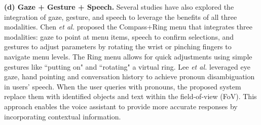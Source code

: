 \documentclass[review]{fcs}
\newcommand{\revise}[2]{\textcolor[rgb]{0,0,0}{#2}}
\begin{document}
\textbf{(d) Gaze + Gesture + Speech.} Several studies have also explored the integration of gaze, gesture, and speech to leverage the benefits of all three modalities.
\revise{Chen \textit{et al.} proposed the Compass+Ring menu that integrates three modalities: gaze is used to point at menu items, speech to confirm selections (avoiding the Midas Touch problem), and gestures to adjust parameters by rotating the wrist or pinching fingers to navigate menu levels. The Ring menu allows for quick adjustments using simple gestures like ``putting on" and ``rotating" a virtual ring \cite{DBLP:conf/ismar/ChenGFCL23}. Lee \textit{et al.} leveraged eye gaze, hand pointing and conversation history to achieve pronoun disambiguation in users' speech. When the user queries using pronouns, the proposed system identifies objects and text within the field-of-view (FoV) to replace the pronouns. This approach enables the voice assistant to provide more accurate responses by incorporating contextual information \cite{DBLP:conf/chi/0005WBCRF24}.}{Chen \textit{et al.} \cite{DBLP:conf/ismar/ChenGFCL23} proposed the Compass+Ring menu that integrates three modalities: gaze to point at menu items, speech to confirm selections, and gestures to adjust parameters by rotating the wrist or pinching fingers to navigate menu levels. The Ring menu allows for quick adjustments using simple gestures like ``putting on" and ``rotating" a virtual ring. Lee \textit{et al.} \cite{DBLP:conf/chi/0005WBCRF24} leveraged eye gaze, hand pointing and conversation history to achieve pronoun disambiguation in users' speech. When the user queries with pronouns, the proposed system replace them with identified objects and text within the field-of-view (FoV). This approach enables the voice assistant to provide more accurate responses by incorporating contextual information.}
\end{document}
